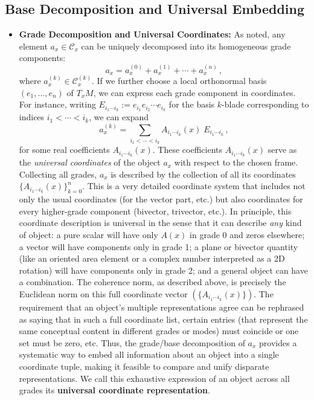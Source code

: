\documentclass[12pt]{article}
\begin{document}
\subsection{Base Decomposition and Universal Embedding}
\begin{itemize}
    \item \textbf{Grade Decomposition and Universal Coordinates:} As noted, any element $a_x \in \mathcal{C}_x$ can be uniquely decomposed into its homogeneous grade components: 
    \[
       a_x = a_x^{(0)} + a_x^{(1)} + \cdots + a_x^{(n)}\,,
    \] 
    where $a_x^{(k)} \in \mathcal{C}_x^{(k)}$. If we further choose a local orthonormal basis $(e_1,\dots,e_n)$ of $T_xM$, we can express each grade component in coordinates. For instance, writing $E_{i_1\cdots i_k} := e_{i_1}e_{i_2}\cdots e_{i_k}$ for the basis $k$-blade corresponding to indices $i_1 < \cdots < i_k$, we can expand 
    \[
       a_x^{(k)} = \sum_{i_1<\cdots<i_k} A_{i_1\cdots i_k}(x)\; E_{i_1\cdots i_k}\,,
    \] 
    for some real coefficients $A_{i_1\cdots i_k}(x)$. These coefficients $A_{i_1\cdots i_k}(x)$ serve as the \emph{universal coordinates} of the object $a_x$ with respect to the chosen frame. Collecting all grades, $a_x$ is described by the collection of all its coordinates $\{A_{i_1\cdots i_k}(x)\}_{k=0}^n$. This is a very detailed coordinate system that includes not only the usual coordinates (for the vector part, etc.) but also coordinates for every higher-grade component (bivector, trivector, etc.). In principle, this coordinate description is universal in the sense that it can describe \emph{any} kind of object: a pure scalar will have only $A(x)$ in grade 0 and zeros elsewhere; a vector will have components only in grade 1; a plane or bivector quantity (like an oriented area element or a complex number interpreted as a 2D rotation) will have components only in grade 2; and a general object can have a combination. The coherence norm, as described above, is precisely the Euclidean norm on this full coordinate vector $(\{A_{i_1\cdots i_k}(x)\})$. The requirement that an object’s multiple representations agree can be rephrased as saying that in such a full coordinate list, certain entries (that represent the same conceptual content in different grades or modes) must coincide or one set must be zero, etc. Thus, the grade/base decomposition of $a_x$ provides a systematic way to embed all information about an object into a single coordinate tuple, making it feasible to compare and unify disparate representations. We call this exhaustive expression of an object across all grades its \textbf{universal coordinate representation}.


\end{itemize}
\end{document}
